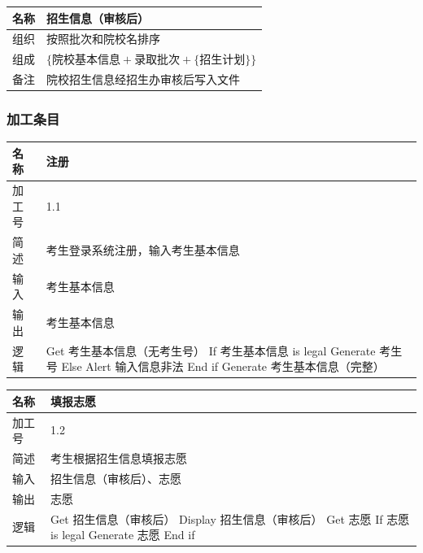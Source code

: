 \documentclass[CJK,utf8]{ctexrep}
\begin{document}
\begin{tabularx}{0.85\textwidth}{|l|X|}
	\hline
	\textbf{名称} & \textbf{招生信息（审核后）} \\
	\hline
	组织 & 按照批次和院校名排序 \\
	\hline
	组成 & $\lbrace\text{院校基本信息}+\text{录取批次}+
	\lbrace\text{招生计划}\rbrace\rbrace$ \\
	\hline
	备注 & 院校招生信息经招生办审核后写入文件 \\
	\hline
\end{tabularx}

\subsubsection*{加工条目}

\begin{tabularx}{0.85\textwidth}{|l|X|}
	\hline
	\textbf{名称} & \textbf{注册} \\
	\hline
	加工号 & 1.1 \\
	\hline
	简述 & 考生登录系统注册，输入考生基本信息 \\
	\hline
	输入 & 考生基本信息 \\
	\hline
	输出 & 考生基本信息 \\
	\hline
	\multirow{7}{*}{逻辑} & \ttfamily
		Get 考生基本信息（无考生号）
		If 考生基本信息 is legal \newline
		Generate 考生号 \newline
		Else \newline
		Alert 输入信息非法 \newline
		End if \newline
		Generate 考生基本信息（完整） \\
	\hline
\end{tabularx}

\begin{tabularx}{0.85\textwidth}{|l|X|}
	\hline
	\textbf{名称} & \textbf{填报志愿} \\
	\hline
	加工号 & 1.2 \\
	\hline
	简述 & 考生根据招生信息填报志愿 \\
	\hline
	输入 & 招生信息（审核后）、志愿 \\
	\hline
	输出 & 志愿 \\
	\hline
	\multirow{6}{*}{逻辑} & \ttfamily
	Get 招生信息（审核后） \newline
	Display 招生信息（审核后） \newline
	Get 志愿 \newline
	If 志愿 is legal \newline
	Generate 志愿 \newline
	End if \\
	\hline
\end{tabularx}
\end{document}

